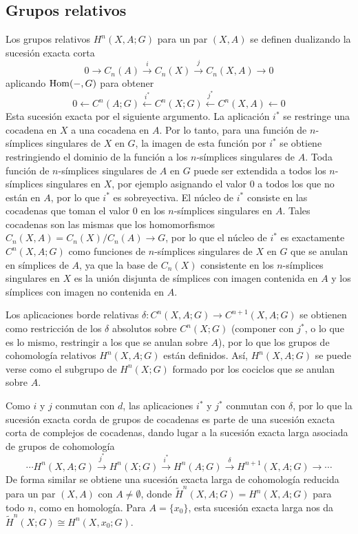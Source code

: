 \documentclass[TA.tex]{subfiles}
\begin{document}
\subsection{Grupos relativos}

Los grupos relativos $H^n(X,A;G)$ para un par $(X,A)$ se definen dualizando la sucesión exacta corta 
\[0\to C_n(A)\xrightarrow{i} C_n(X)\xrightarrow{j} C_n(X,A)\to 0\]
aplicando $\operatorname{Hom}(-,G)$ para obtener
\[0\leftarrow C^n(A;G)\xleftarrow{i^*} C^n(X;G)\xleftarrow{j^*} C^n(X,A)\leftarrow 0\]
Esta sucesión exacta por el siguiente argumento. La aplicación $i^*$ se restringe una cocadena en $X$ a una cocadena en $A$. Por lo tanto, para una función de $n$-símplices singulares de $X$ en $G$, la imagen de esta función por $i^*$ se obtiene restringiendo el dominio de la función a los $n$-símplices singulares de $A$. Toda función de $n$-símplices singulares de $A$ en $G$ puede ser extendida a todos los $n$-símplices singulares en $X$, por ejemplo asignando el valor 0 a todos los que no están en $A$, por lo que $i^*$ es sobreyectiva. El núcleo de $i^*$ consiste en las cocadenas que toman el valor 0 en los $n$-símplices singulares en $A$. Tales cocadenas son las mismas que los homomorfismos $C_n(X,A)=C_n(X)/C_n(A)\to G$, por lo que el núcleo de $i^*$ es exactamente $C^n(X,A;G)$ como funciones de $n$-símplices singulares de $X$ en $G$ que se anulan en símplices de $A$, ya que la base de $C_n(X)$ consistente en los $n$-símplices singulares en $X$ es la unión disjunta de símplices con imagen contenida en $A$ y los símplices con imagen no contenida en $A$. 

Los aplicaciones borde relativas $\delta:C^n(X,A;G)\to C^{n+1}(X,A;G)$ se obtienen como restricción de los $\delta$ absolutos sobre $C^n(X;G)$ (componer con $j^*$, o lo que es lo mismo, restringir a los que se anulan sobre $A$), por lo que los grupos de cohomología relativos $H^n(X,A;G)$ están definidos. Así, $H^n(X,A;G)$ se puede verse como el subgrupo de $H^n(X;G)$ formado por los cociclos que se anulan sobre $A$.

Como $i$ y $j$ conmutan con $d$, las aplicaciones $i^*$ y $j^*$ conmutan con $\delta$, por lo que la sucesión exacta corda de grupos de cocadenas es parte de una sucesión exacta corta de complejos de cocadenas, dando lugar a la sucesión exacta larga asociada de grupos de cohomología
\[\cdots H^n(X,A;G)\xrightarrow{j^*}H^n(X;G)\xrightarrow{i^*}H^n(A;G)\xrightarrow{\delta}H^{n+1}(X,A;G)\to\cdots\]
De forma similar se obtiene una sucesión exacta larga de cohomología reducida para un par $(X,A)$ con $A\neq\emptyset$, donde $\widetilde{H}^n(X,A;G)=H^n(X,A;G)$ para todo $n$, como en homología. Para $A=\{x_0\}$, esta sucesión exacta larga nos da $\widetilde{H}^n(X;G)\cong H^n(X,x_0;G)$.
\end{document}
